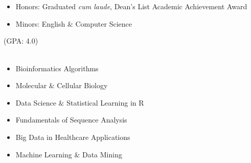 \documentclass[hidelinks, 11pt]{article}
\begin{document}
\section*{}
\begin{addmargin}{.5in}

  \begin{itemize}\setlength\itemsep{-4pt}
    \item{Honors: Graduated \emph{cum laude}, 
          Dean's List Academic Achievement Award}
    \item{Minors: English $\&$ Computer Science}
  \end{itemize}
  (GPA: 4.0) \\ \\
  \vspace{-9pt}
  \begin{multicols}{2}
    \begin{itemize}\setlength\itemsep{-4pt}
      \item{Bioinformatics Algorithms}
      \item{Molecular $\&$ Cellular Biology}
      \item{Data Science $\&$ Statistical Learning in R}
      \item{Fundamentals of Sequence Analysis}
      \item{Big Data in Healthcare Applications}
      \item{Machine Learning $\&$ Data Mining}
    \end{itemize}
  \end{multicols}
\end{addmargin}
\vspace{-6pt}

\end{document}

